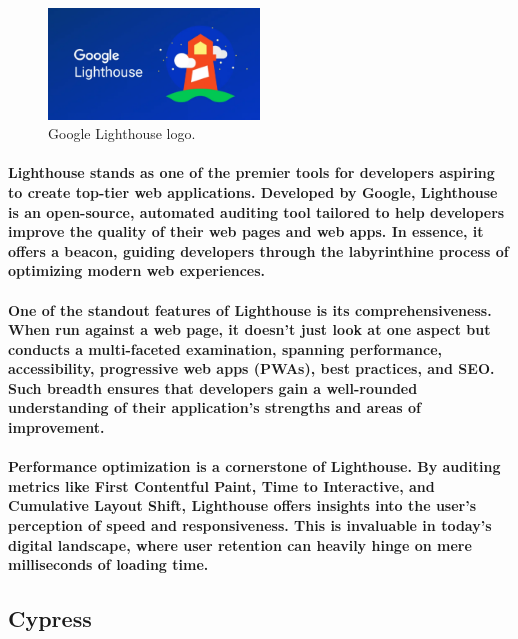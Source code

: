 \documentclass[12pt,a4paper]{article}
\begin{document}
    \begin{figure}[h!]
      \centering
      \includegraphics[width=0.5\textwidth]{lighthouse.png}
      \caption{Google Lighthouse logo.}
    \end{figure}

    \paragraph{Lighthouse stands as one of the premier tools for developers aspiring to create top-tier web applications. Developed by Google, Lighthouse is an open-source, automated auditing tool tailored to help developers improve the quality of their web pages and web apps. In essence, it offers a beacon, guiding developers through the labyrinthine process of optimizing modern web experiences.}
    
    \paragraph{One of the standout features of Lighthouse is its comprehensiveness. When run against a web page, it doesn’t just look at one aspect but conducts a multi-faceted examination, spanning performance, accessibility, progressive web apps (PWAs), best practices, and SEO. Such breadth ensures that developers gain a well-rounded understanding of their application’s strengths and areas of improvement.}
    
    \paragraph{Performance optimization is a cornerstone of Lighthouse. By auditing metrics like First Contentful Paint, Time to Interactive, and Cumulative Layout Shift, Lighthouse offers insights into the user’s perception of speed and responsiveness. This is invaluable in today’s digital landscape, where user retention can heavily hinge on mere milliseconds of loading time.}

    \subsection{Cypress}
\end{document}
